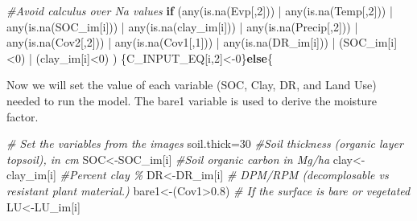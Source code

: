 \documentclass[
  10pt,
  b5paper,
]{book}
\newenvironment{Shaded}{\begin{snugshade}}{\end{snugshade}}
\newcommand{\CommentTok}[1]{\textcolor[rgb]{0.56,0.35,0.01}{\textit{#1}}}
\newcommand{\ControlFlowTok}[1]{\textcolor[rgb]{0.13,0.29,0.53}{\textbf{#1}}}
\newcommand{\DecValTok}[1]{\textcolor[rgb]{0.00,0.00,0.81}{#1}}
\newcommand{\FloatTok}[1]{\textcolor[rgb]{0.00,0.00,0.81}{#1}}
\newcommand{\FunctionTok}[1]{\textcolor[rgb]{0.00,0.00,0.00}{#1}}
\newcommand{\NormalTok}[1]{#1}
\newcommand{\OtherTok}[1]{\textcolor[rgb]{0.56,0.35,0.01}{#1}}
\newcommand{\SpecialCharTok}[1]{\textcolor[rgb]{0.00,0.00,0.00}{#1}}
\begin{document}
\begin{Shaded}
\begin{Highlighting}[]
\CommentTok{\#Avoid calculus over Na values }
\ControlFlowTok{if}\NormalTok{ (}\FunctionTok{any}\NormalTok{(}\FunctionTok{is.na}\NormalTok{(Evp[,}\DecValTok{2}\NormalTok{])) }\SpecialCharTok{|} \FunctionTok{any}\NormalTok{(}\FunctionTok{is.na}\NormalTok{(Temp[,}\DecValTok{2}\NormalTok{])) }\SpecialCharTok{|} \FunctionTok{any}\NormalTok{(}\FunctionTok{is.na}\NormalTok{(SOC\_im[i])) }\SpecialCharTok{|} \FunctionTok{any}\NormalTok{(}\FunctionTok{is.na}\NormalTok{(clay\_im[i])) }\SpecialCharTok{|} \FunctionTok{any}\NormalTok{(}\FunctionTok{is.na}\NormalTok{(Precip[,}\DecValTok{2}\NormalTok{]))  }\SpecialCharTok{|}  \FunctionTok{any}\NormalTok{(}\FunctionTok{is.na}\NormalTok{(Cov2[,}\DecValTok{2}\NormalTok{]))  }\SpecialCharTok{|}  \FunctionTok{any}\NormalTok{(}\FunctionTok{is.na}\NormalTok{(Cov1[,}\DecValTok{1}\NormalTok{]))  }\SpecialCharTok{|} \FunctionTok{any}\NormalTok{(}\FunctionTok{is.na}\NormalTok{(DR\_im[i])) }\SpecialCharTok{|}\NormalTok{  (SOC\_im[i]}\SpecialCharTok{\textless{}}\DecValTok{0}\NormalTok{) }\SpecialCharTok{|}\NormalTok{ (clay\_im[i]}\SpecialCharTok{\textless{}}\DecValTok{0}\NormalTok{) ) \{C\_INPUT\_EQ[i,}\DecValTok{2}\NormalTok{]}\OtherTok{\textless{}{-}}\DecValTok{0}\NormalTok{\}}\ControlFlowTok{else}\NormalTok{\{}
\end{Highlighting}
\end{Shaded}

Now we will set the value of each variable (SOC, Clay, DR, and Land Use) needed to run the model. The bare1 variable is used to derive the moisture factor.

\begin{Shaded}
\begin{Highlighting}[]
\CommentTok{\# Set the variables from the images}
\NormalTok{soil.thick}\OtherTok{=}\DecValTok{30}  \CommentTok{\#Soil thickness (organic layer topsoil), in cm}
\NormalTok{SOC}\OtherTok{\textless{}{-}}\NormalTok{SOC\_im[i]      }\CommentTok{\#Soil organic carbon in Mg/ha }
\NormalTok{clay}\OtherTok{\textless{}{-}}\NormalTok{clay\_im[i]        }\CommentTok{\#Percent clay \%}
\NormalTok{DR}\OtherTok{\textless{}{-}}\NormalTok{DR\_im[i]              }\CommentTok{\# DPM/RPM (decomplosable vs resistant plant material.)}
\NormalTok{bare1}\OtherTok{\textless{}{-}}\NormalTok{(Cov1}\SpecialCharTok{\textgreater{}}\FloatTok{0.8}\NormalTok{)           }\CommentTok{\# If the surface is bare or vegetated}
\NormalTok{LU}\OtherTok{\textless{}{-}}\NormalTok{LU\_im[i]}
\end{Highlighting}
\end{Shaded}
\end{document}
